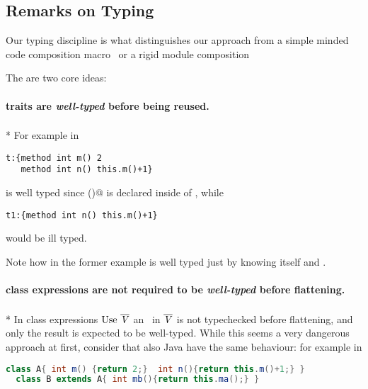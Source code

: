 \begin{comment}
  reduces/is equivalent to/is flatted into
  
 \begin{lstlisting}
A:{implements IA method int ma() Utils.m(this) }
B:{implements IA
  method int ma() Utils.m(this)
  method int mb() this.ma() } 

 \end{lstlisting}
 
This code seems correct, and there is no mention of the trait \Q@ta@. In some sense, all the information about code reuse/subclassing is just a private implementation detail of \Q@A@ and \Q@B@; while subtyping is part of the class interface.
\end{comment}


\subsection{Remarks on Typing}
Our typing discipline is 
what distinguishes our approach from a simple minded code composition macro~\cite{bawden1999quasiquotation}
or a rigid module composition~\cite{ancona2002calculus}

The are two core ideas:
\paragraph*{traits are \emph{well-typed} before being reused.}${}_{}$\\*
 For example in

\begin{lstlisting}
t:{method int m() 2 
   method int n() this.m()+1}
\end{lstlisting}

\noindent \Q@t@ is well typed since \Q@m()@ is declared inside of \Q@t@, while

\begin{lstlisting}
t1:{method int n() this.m()+1} 
\end{lstlisting}
\noindent would be ill typed.

\noindent Note how in the former example \Q@ta@ is well typed just by
knowing itself and \Q@IA@.

\paragraph*{class expressions are not required to be \emph{well-typed} before flattening.}${}_{}$\\*
In class expressions  $\use\ \overline\mV$
an \mL\ in $\overline{\mathit{V}}$ is not typechecked before flattening, and only the result is expected to be well-typed.
While this seems a very dangerous approach at first, consider that also Java have the same behaviour:
for example in
\begin{lstlisting}[language=Java]
  class A{ int m() {return 2;}  int n(){return this.m()+1;} }
  class B extends A{ int mb(){return this.ma();} }
\end{lstlisting}

